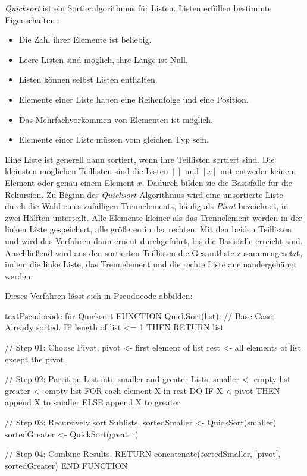 \textit{Quicksort} ist ein Sortieralgorithmus für Listen. Listen erfüllen bestimmte Eigenschaften \cite[S. 51]{003_KII11_basics-of-artificial-intelligence}:

\begin{itemize}
    \item Die Zahl ihrer Elemente ist beliebig.
    \item Leere Listen sind möglich, ihre Länge ist Null.
    \item Listen können selbst Listen enthalten.
    \item Elemente einer Liste haben eine Reihenfolge und eine Position.
    \item Das Mehrfachvorkommen von Elementen ist möglich.
    \item Elemente einer Liste müssen vom gleichen Typ sein.
\end{itemize}

Eine Liste ist generell dann sortiert, wenn ihre Teillisten sortiert sind. Die kleinsten möglichen Teillisten sind die Listen $[]$ und $[x]$ mit entweder keinem Element oder genau einem Element $x$. Dadurch bilden sie die Basisfälle für die Rekursion. Zu Beginn des \textit{Quicksort}-Algorithmus wird eine unsortierte Liste durch die Wahl eines zufälligen Trennelements, häufig als \textit{Pivot} bezeichnet, in zwei Hälften unterteilt. Alle Elemente kleiner als das Trennelement werden in der linken Liste gespeichert, alle größeren in der rechten. Mit den beiden Teillisten  und  wird das Verfahren dann erneut durchgeführt, bis die Basisfälle erreicht sind. Anschließend wird aus den sortierten Teillisten die Gesamtliste zusammengesetzt, indem die linke Liste, das Trennelement und die rechte Liste aneinandergehängt werden.

Dieses Verfahren lässt sich in Pseudocode abbilden:

\begin{snippet}[htb]
    \centering
    \begin{codebox}{text}{Pseudocode für Quicksort}
        FUNCTION QuickSort(list):
            // Base Case: Already sorted.
            IF length of list <= 1 THEN
                RETURN list

            // Step 01: Choose Pivot.
            pivot <- first element of list
            rest <- all elements of list except the pivot

            // Step 02: Partition List into smaller and greater Lists.
            smaller <- empty list
            greater <- empty list
            FOR each element X in rest DO
                IF X < pivot THEN
                    append X to smaller
                ELSE
                    append X to greater

            // Step 03: Recursively sort Sublists.
            sortedSmaller <- QuickSort(smaller)
            sortedGreater <- QuickSort(greater)

            // Step 04: Combine Results.
            RETURN concatenate(sortedSmaller, [pivot], sortedGreater)
        END FUNCTION
    \end{codebox}
    \caption{Pseudocode für den \textit{Quicksort}-Algorithmus}
    \label{snippet:01-01_quicksort-pseudocode}
\end{snippet}

